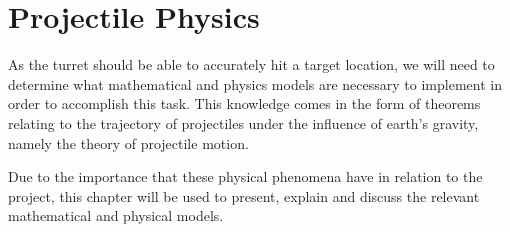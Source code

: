 \chapter{Projectile Physics}\label{ProjPhys}
As the turret should be able to accurately hit a target location, we will need
to determine what mathematical and physics models are necessary to implement in
order to accomplish this task. This knowledge comes in the form of theorems
relating to the trajectory of projectiles under the influence of earth's
gravity, namely the theory of projectile motion.


Due to the importance that these physical phenomena have in relation to the
project, this chapter will be used to present, explain and discuss the relevant
mathematical and physical models.





